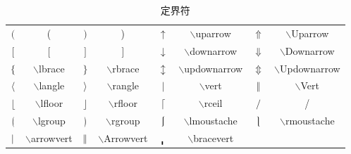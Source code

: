 \documentclass[UTF8]{ctexart}
\begin{document}
\begin{table}[H]
	\begin{center}
		\caption{定界符}
		\begin{tabular}{cccccccc}
			
			
			$($  &  (  &  $)$  & )  &  $\uparrow$  & $\backslash$uparrow  &  $\Uparrow$  &  $\backslash$Uparrow \\
			
			$[$ &  [ &  $]$  &  ]   &  $\downarrow$  & $\backslash$downarrow &  $\Downarrow$ & $\backslash$Downarrow \\
			
			
			$\lbrace$  &  $\backslash$lbrace  &  $\rbrace$  & $\backslash$rbrace  &  $\updownarrow$  & $\backslash$updownarrow  &  $\Updownarrow$  &  $\backslash$Updownarrow \\
			
			$\langle$ & $\backslash$langle &  $\rangle$  & $\backslash$rangle   &  $\vert$  & $\backslash$vert &  $\Vert$ & $\backslash$Vert \\
			
			$\lfloor$ & $\backslash$lfloor &  $\rfloor$  & $\backslash$rfloor   &  $\lceil$  & $\backslash$rceil &  $/$ & / \\	
			
			
			$\lgroup$ & $\backslash$lgroup &  $\rgroup$  & $\backslash$rgroup   &  $\lmoustache$  & $\backslash$lmoustache &  $\rmoustache$ & $\backslash$rmoustache \\
			
			$\arrowvert$ & $\backslash$arrowvert &  $\Arrowvert$  & $\backslash$Arrowvert   &  $\bracevert$  & $\backslash$bracevert  \\
		
			
		\end{tabular}
	\end{center}
\end{table}
\end{document}
